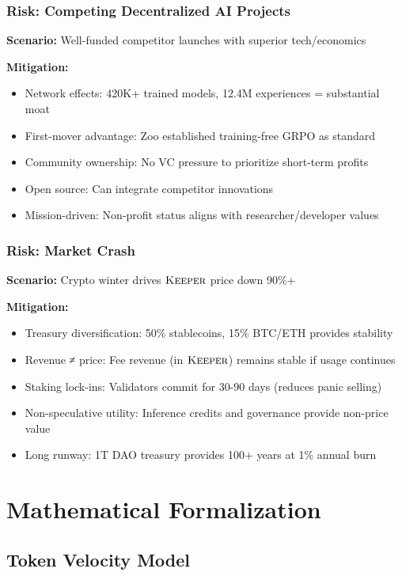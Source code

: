 \documentclass[11pt,letterpaper]{article}
\theoremstyle{definition}
\theoremstyle{remark}
\newcommand{\KEEPER}{\textsc{Keeper}}
\begin{document}
\subsubsection{Risk: Competing Decentralized AI Projects}

\textbf{Scenario:} Well-funded competitor launches with superior tech/economics

\textbf{Mitigation:}
\begin{itemize}
\item Network effects: 420K+ trained models, 12.4M experiences = substantial moat
\item First-mover advantage: Zoo established training-free GRPO as standard
\item Community ownership: No VC pressure to prioritize short-term profits
\item Open source: Can integrate competitor innovations
\item Mission-driven: Non-profit status aligns with researcher/developer values
\end{itemize}

\subsubsection{Risk: Market Crash}

\textbf{Scenario:} Crypto winter drives $\KEEPER$ price down 90\%+

\textbf{Mitigation:}
\begin{itemize}
\item Treasury diversification: 50\% stablecoins, 15\% BTC/ETH provides stability
\item Revenue ≠ price: Fee revenue (in $\KEEPER$) remains stable if usage continues
\item Staking lock-ins: Validators commit for 30-90 days (reduces panic selling)
\item Non-speculative utility: Inference credits and governance provide non-price value
\item Long runway: 1T DAO treasury provides 100+ years at 1\% annual burn
\end{itemize}

\section{Mathematical Formalization}

\subsection{Token Velocity Model}
\end{document}
